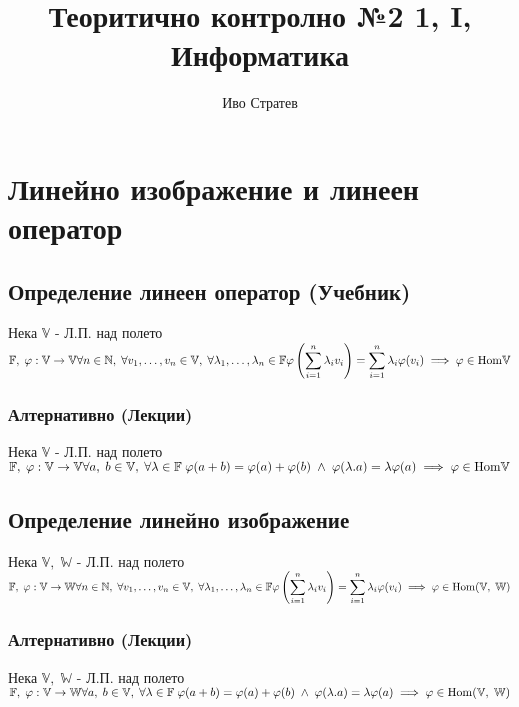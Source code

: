 \documentclass{article}
\title{Теоритично контролно №2 1, I, Информатика}
\author{Иво Стратев}
\newcommand{\V}{\mathbb{V}}
\newcommand{\N}{\mathbb{N}}
\newcommand{\F}{\mathbb{F}}
\newcommand{\W}{\mathbb{W}}
\newcommand{\n}[1]{#1_1, \dots, #1_n}
\begin{document}
    \maketitle
    \section{Линейно изображение и линеен оператор}
    \subsection{Определение линеен оператор (Учебник)}
    Нека \(\V\) - Л.П. над полето \(\F, \; \varphi : \V \to \V \\\\
    \forall n \in \N, \; \forall \n{v} \in \V, \; \forall \n{\lambda} \in \F \\\\
    \varphi\left(\displaystyle\sum_{i = 1}^n \lambda_i v_i\right)
    = \displaystyle\sum_{i = 1}^n \lambda_i \varphi(v_i) \implies \varphi \in \mathrm{Hom}\V \)
    \subsubsection{Алтернативно (Лекции)}
    Нека \(\V\) - Л.П. над полето \(\F, \; \varphi : \V \to \V \\\\
    \forall a, \; b \in \V, \; \forall \lambda \in \F \;
    \varphi(a + b) = \varphi(a) + \varphi(b) \; \land \; \varphi(\lambda.a) = \lambda\varphi(a) \\\\
    \implies \varphi \in \mathrm{Hom}\V \)
    \subsection{Определение линейно изображение}
    Нека \(\V, \; \W\) - Л.П. над полето \(\F, \; \varphi : \V \to \W \\\\
    \forall n \in \N, \; \forall \n{v} \in \V, \; \forall \n{\lambda} \in \F \\\\
    \varphi\left(\displaystyle\sum_{i = 1}^n \lambda_i v_i\right)
    = \displaystyle\sum_{i = 1}^n \lambda_i \varphi(v_i) \implies \varphi \in \mathrm{Hom}(\V, \; \W) \)
    \subsubsection{Алтернативно (Лекции)}
    Нека \(\V, \; \W\) - Л.П. над полето \(\F, \; \varphi : \V \to \W \\\\
    \forall a, \; b \in \V, \; \forall \lambda \in \F \;
    \varphi(a + b) = \varphi(a) + \varphi(b) \; \land \; \varphi(\lambda.a) = \lambda\varphi(a) \\\\
    \implies \varphi \in \mathrm{Hom}(\V, \; \W) \)
\end{document}
